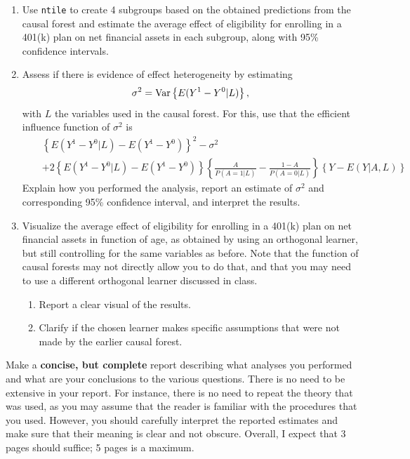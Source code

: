 \documentclass[11pt,fleqn]{article}
\begin{document}
\begin{enumerate}
\item Use \texttt{ntile} to create 4 subgroups based on the obtained predictions from the causal forest and estimate the average effect of eligibility for enrolling in a 401(k) plan on net financial assets in each subgroup, along with 95\% confidence intervals. %
\item Assess if there is evidence of effect heterogeneity by estimating 
\[\sigma^2=\mbox{\rm Var}\left\{E(Y^1-Y^0|L)\right\},\]
with $L$ the variables used in the causal forest. For this, use that the efficient influence function of $\sigma^2$ is 
\begin{eqnarray*}
 &&\left\{E(Y^1-Y^0|L)-E(Y^1-Y^0)\right\}^2-\sigma^2\\
 &&+2\left\{E(Y^1-Y^0|L)-E(Y^1-Y^0)\right\}\left\{\frac{A}{P(A=1|L)}-\frac{1-A}{P(A=0|L)}\right\}\left\{Y-E(Y|A,L)\right\}
\end{eqnarray*}
Explain how you performed the analysis, report an estimate of $\sigma^2$ and corresponding 95\% confidence interval, and interpret the results.
\item Visualize the average effect of eligibility for enrolling in a 401(k) plan on net financial assets in function of age, as obtained by using an orthogonal learner, but still controlling for the same variables as before. Note that the function of causal forests may not directly allow you to do that, and that you may need to use a different orthogonal learner discussed in class. 
\begin{enumerate}
\item Report a clear visual of the results.
\item Clarify if the chosen learner makes specific assumptions that were not made by the earlier causal forest. 
\end{enumerate}

\end{enumerate}

Make a \textbf{concise, but complete} report describing what analyses you performed
and what are your conclusions to the various questions. There is no need to be extensive in your report. For instance, there is no need to repeat the theory that was used, as you may assume that the reader is familiar with the procedures that you used. However, you should carefully interpret the reported estimates and make
sure that their meaning is clear and not obscure. 
Overall, I expect that 3 pages should suffice; 5 pages is a maximum.
\end{document}
